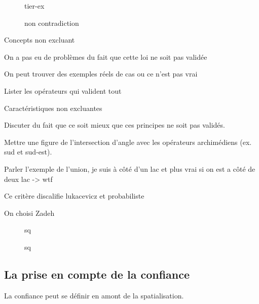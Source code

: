 
\begin{figure}
  \centering
  
  \caption{tier-ex}
\end{figure}


\begin{figure}
  \centering
  
  \caption{non contradiction}
\end{figure}

Concepts non excluant

On a pas eu de problèmes du fait que cette loi ne soit pas validée

On peut trouver des exemples réels de cas ou ce n'est pas vrai

Lister les opérateurs qui valident tout

Caractéristiques non excluantes

Discuter du fait que ce soit mieux que ces principes ne soit pas
validés.


Mettre une figure de l'intersection d'angle avec les opérateurs
archimédiens (ex. sud et sud-est).

Parler l'exemple de l'union, je suis à côté d'un lac et plus vrai si
on est a côté de deux lac -> wtf

Ce critère discalifie lukacevicz et probabiliste


On choisi Zadeh

\begin{figure}
  \centering
  
  \caption{sq}
\end{figure}

\begin{figure}
  \centering
  
  \caption{sq}
\end{figure}



\subsection{La prise en compte de la confiance}

La confiance peut se définir en amont de la spatialisation.

